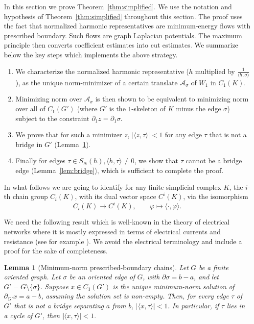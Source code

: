 \documentclass[11pt]{amsart}
\theoremstyle{theorem}
\newtheorem{lemma}{Lemma}[section]
\theoremstyle{remark}
\theoremstyle{definition}
\newcommand {\la}   {{\langle}}
\newcommand {\ra}   {{\rangle}}
\begin{document}
In this section we prove Theorem~\ref{thm:simplified}. 
We use the notation and hypothesis of Theorem~\ref{thm:simplified} throughout this section.
The proof uses the fact that normalized harmonic representatives are minimum-energy flows with prescribed boundary. Such flows are graph Laplacian potentials. The maximum principle then converts coefficient estimates into cut estimates.
We summarize below the key steps which implements the above strategy. 
\begin{enumerate}[label=\arabic*.]

\item
We characterize the normalized harmonic representative ($h$ multiplied by $\frac{1}{\la h,\sigma \ra}$), as the unique norm-minimizer of a certain translate $\mathcal{A}_\sigma$ of $W_1$ in $C_1(K)$.
\item
Minimizing norm over $\mathcal{A}_\sigma$ is then shown to be equivalent to minimizing 
norm over all of $C_1(G')$ (where $G'$ is the $1$-skeleton of $K$ minus the edge $\sigma$) subject to the constraint $\partial_1 z = \partial_1 \sigma$.
\item
We prove that for such a minimizer $z$, $|\la z , \tau \ra| < 1$ for any edge $\tau$ that is not a bridge in $G'$
(Lemma~\ref{lem:graph}). 
\item
Finally for edges $\tau \in S_N(h), \la h,\tau\ra \neq 0$, we show that $\tau$ cannot be a bridge edge (Lemma~\ref{lem:bridge}), which is sufficient to complete the proof.  
\end{enumerate}

In what follows we are going to identify for any finite simplicial complex $K$,
the $i$-th chain group $C_i(K)$, with its dual vector space $C^i(K)$, via the 
isomorphism 
\[
C_i(K) \rightarrow C^i(K), \qquad \varphi \longmapsto \la \cdot, \varphi \ra.
\]

We need the following result which is well-known in the theory of electrical networks where it is mostly expressed in terms of electrical currents and resistance (see for example \cite{Doyle-Snell-book,Lyons-Peres-book}). We avoid the electrical terminology and include a proof for the sake of completeness.



\begin{lemma}[Minimum-norm prescribed-boundary chains]
\label{lem:graph}
Let \(G\) be a finite oriented graph. Let \(\sigma\) be an oriented edge of
\(G\), with
$
\partial\sigma=b-a
$,
and let
$
G'=G\setminus\{\sigma\}
$.
Suppose 
\(x\in C_1(G')\) is the unique minimum-norm solution of
$
\partial_{G'} x=a-b
$,
assuming the solution set is non-empty.
Then, for every edge \(\tau\) of \(G'\) that is not a bridge separating \(a\)
from \(b\),
$
|\langle x,\tau\rangle|<1
$.
In particular, if \(\tau\) lies in a cycle of \(G'\), then
$
|\langle x,\tau\rangle|<1
$.
\end{lemma}
\end{document}
